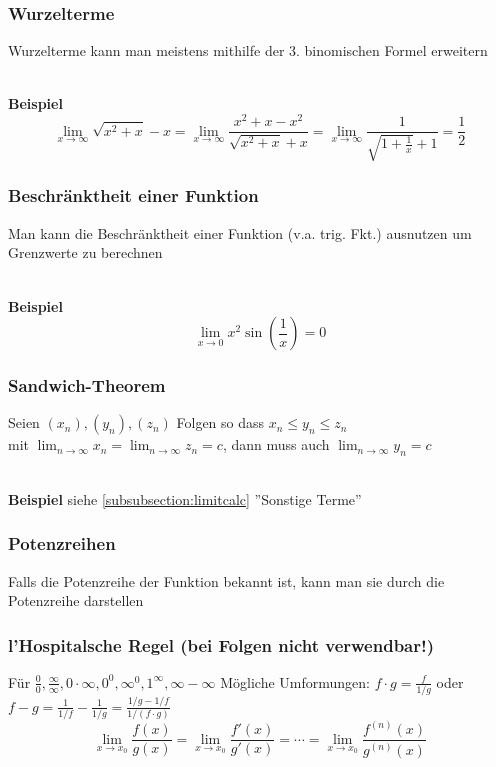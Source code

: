 \documentclass[8pt, a4paper, landscape, fleqn]{scrartcl}
\newenvironment {example}
				{\begin{itshape} \begin{small}}
				{\end{small} \end{itshape}}
\newenvironment {eq}
				{\begin{equation*}}
				{\end{equation*}}
\begin{document}
\begin{multicols*}{3}
				\subsubsection{Wurzelterme}
					Wurzelterme kann man meistens mithilfe der 3. binomischen Formel erweitern\\\\
					\begin{example}
						\textbf{Beispiel}
						\begin{equation*}
							\lim_{x \rightarrow \infty} \sqrt{x^2+x}-x = \lim_{x \rightarrow \infty} \frac{x^2+x-x^2}{\sqrt{x^2+x}+x} = \lim_{x \rightarrow \infty} \frac{1}{\sqrt{1+\frac{1}{x}}+1}=\frac{1}{2}
						\end{equation*}
					\end{example}
				\subsubsection{Beschränktheit einer Funktion}
					Man kann die Beschränktheit einer Funktion (v.a. trig. Fkt.) ausnutzen um Grenzwerte zu berechnen\\\\
					\begin{example}
						\textbf{Beispiel}
						\begin{equation*}
							\lim_{x \rightarrow 0} x^2 \sin \left(\frac{1}{x} \right) = 0
						\end{equation*}
					\end{example}
				\subsubsection{Sandwich-Theorem}
					Seien $(x_n),(y_n),(z_n)$ Folgen so dass $x_n\le y_n\le z_n$\\ mit $\lim_{n \rightarrow \infty} x_n= \lim_{n \rightarrow \infty} z_n=c$, dann muss auch $\lim_{n \rightarrow \infty} y_n=c $ \\\\
					\begin{example}
						\textbf{Beispiel} siehe \ref{subsubsection:limitcalc} ''Sonstige Terme'' \end{example}
				\subsubsection{Potenzreihen}
					Falls die Potenzreihe der Funktion bekannt ist, kann man sie durch die Potenzreihe darstellen
				\subsubsection{l'Hospitalsche Regel (bei Folgen nicht verwendbar!)}
				Für $\frac{0}{0}, \frac{\infty}{\infty}, 0\cdot\infty, 0^0, \infty^0, 1^\infty, \infty - \infty$ Mögliche Umformungen: $f\cdot g = \frac{f}{1/g}$ oder $f-g = \frac{1}{1/f}-\frac{1}{1/g} = \frac{1/g - 1/f}{1/(f\cdot g)}$
					\begin{eq}
						\lim_{x \rightarrow x_0} \frac{f(x)}{g(x)}=\lim_{x \rightarrow x_0} \frac{f'(x)}{g'(x)}= \cdots =\lim_{x \rightarrow x_0} \frac{f^{(n)}(x)}{g^{(n)}(x)}
					\end{eq}

\end{multicols*}
\end{document}

